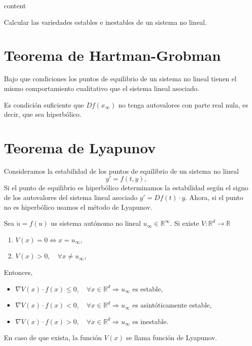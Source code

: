 \begin{theo}
  content
\end{theo}

\begin{ejm}
  Calcular las variedades estables e inestables de un sistema no lineal.
\end{ejm}

\section{Teorema de Hartman-Grobman}

\begin{obs}
  Bajo que condiciones los puntos de equilibrio de un sistema no lineal tienen el mismo comportamiento cualitativo que el sistema lineal asociado.
\end{obs}

\begin{theo}
  Es condición suficiente que $Df(x_{\infty})$ no tenga autovalores con parte real nula, es decir, que sea hiperbólico.
\end{theo}

\section{Teorema de Lyapunov}

\begin{obs}
  Consideramos la estabilidad de los puntos de equilibrio de un sistema no lineal
  \[ 
    y' = f(t,y), 
  \] 
  Si el punto de equilibrio es hiperbólico determinamos la estabilidad según el signo de los autovalores del sistema lineal asociado $y' = Df(t) \cdot y$. Ahora, si el punto no es hiperbólico usamos el método de Lyapunov.
\end{obs}

\begin{theo}[de Lyapunov] 
  Sea $\dot{u} = f(u)$ us sistema autónomo no lineal $u_{\infty} \in \mathbb{R}^{\infty}$. Si existe $V : \mathbb{R}^{d} \to \mathbb{R}$ 
  \begin{enumerate}[label=(\roman*)]
    \item $V(x) = 0 \Leftrightarrow x = u_{\infty}$, 
    \item $V(x) > 0, \quad \forall x \neq u_{\infty}$,
  \end{enumerate}
  Entonces,
  \begin{itemize}
    \item $\nabla V(x) \cdot f(x) \leq 0, \quad \forall x \in \mathbb{R}^{d} \Rightarrow u_{\infty}$ es estable,
    \item $\nabla V(x) \cdot f(x) < 0, \quad \forall x \in \mathbb{R}^{d} \Rightarrow u_{\infty}$ es asintóticamente estable,
    \item $\nabla V(x) \cdot f(x) > 0, \quad \forall x \in \mathbb{R}^{d} \Rightarrow u_{\infty}$ es inestable.
  \end{itemize}
  En caso de que exista, la función $V(x)$ se llama función de Lyapunov.
\end{theo}

